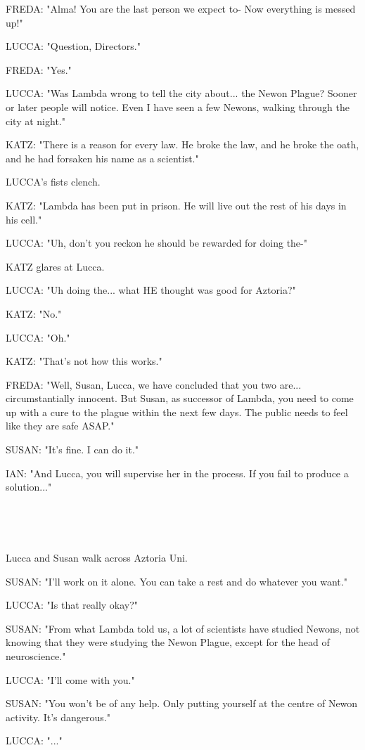 \documentclass[11pt]{article}
\begin{document}
FREDA: "Alma! You are the last person we expect to- 
Now everything is messed up!"

LUCCA: "Question, Directors."

FREDA: "Yes."

LUCCA: "Was Lambda wrong to tell the city about... the Newon Plague?
Sooner or later people will notice.
Even I have seen a few Newons, walking through the city at night."

KATZ: "There is a reason for every law.
He broke the law, and he broke the oath, and he had forsaken his name as a scientist."

LUCCA's fists clench.

KATZ: "Lambda has been put in prison. 
He will live out the rest of his days in his cell."

LUCCA: "Uh, don't you reckon he should be rewarded for doing the-"

KATZ glares at Lucca.

LUCCA: "Uh doing the... what HE thought was good for Aztoria?"

KATZ: "No."

LUCCA: "Oh."

KATZ: "That's not how this works." 

FREDA: "Well, Susan, Lucca, we have concluded that you two are... 
circumstantially innocent.
But Susan, as successor of Lambda, you need to come up with a cure to the plague within the next few days.
The public needs to feel like they are safe ASAP."

SUSAN: "It's fine.
I can do it."

IAN: "And Lucca, you will supervise her in the process.
If you fail to produce a solution..."

\ 

\ 

Lucca and Susan walk across Aztoria Uni. 

SUSAN: "I'll work on it alone. 
You can take a rest and do whatever you want."

LUCCA: "Is that really okay?"

SUSAN: "From what Lambda told us, a lot of scientists have studied Newons, not knowing that they were studying the Newon Plague, except for the head of neuroscience."

LUCCA: "I'll come with you."

SUSAN: "You won't be of any help.
Only putting yourself at the centre of Newon activity.
It's dangerous."

LUCCA: "..."
\end{document}
